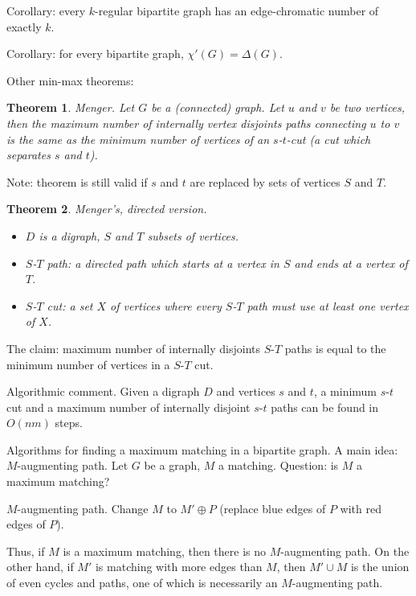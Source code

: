 \documentclass[12pt,a4paper]{article} \usepackage{fontspec}
\newtheorem{theorem}{Theorem} \newtheorem{definition}{Definition}
\begin{document}
Corollary: every \(k\)-regular bipartite graph has an edge-chromatic number of
exactly \(k\).

Corollary: for every bipartite graph, \(\chi'(G) = \Delta(G)\).

Other min-max theorems:

\begin{theorem} Menger.  Let \(G\) be a (connected) graph.  Let \(u\) and \(v\)
be two vertices, then the maximum number of internally vertex disjoints paths
connecting \(u\) to \(v\) is the same as the minimum number of vertices of an
\(s\)-\(t\)-cut (a cut which separates \(s\) and \(t\)).  \end{theorem}

Note: theorem is still valid if \(s\) and \(t\) are replaced by sets of vertices
\(S\) and \(T\).

\begin{theorem} Menger's, directed version.  \begin{itemize} \item \(D\) is a
digraph, \(S\) and \(T\) subsets of vertices.  \item \(S\)-\(T\) path: a
directed path which starts at a vertex in \(S\) and ends at a vertex of \(T\).
\item \(S\)-\(T\) cut: a set \(X\) of vertices where every \(S\)-\(T\) path must
use at least one vertex of \(X\).  \end{itemize} \end{theorem}

The claim: maximum number of internally disjoints \(S\)-\(T\) paths is equal to
the minimum number of vertices in a \(S\)-\(T\) cut.

Algorithmic comment.  Given a digraph \(D\) and vertices \(s\) and \(t\), a
minimum \(s\)-\(t\) cut and a maximum number of internally disjoint \(s\)-\(t\)
paths can be found in \(O(n m)\) steps.

Algorithms for finding a maximum matching in a bipartite graph.  A main idea:
\(M\)-augmenting path.  Let \(G\) be a graph, \(M\) a matching.  Question: is
\(M\) a maximum matching?

\(M\)-augmenting path.  Change \(M\) to \(M' \oplus P\) (replace blue edges of
\(P\) with red edges of \(P\)).

Thus, if \(M\) is a maximum matching, then there is no \(M\)-augmenting path.
On the other hand, if \(M'\) is matching with more edges than \(M\), then \(M'
\cup M\) is the union of even cycles and paths, one of which is necessarily an
\(M\)-augmenting path.
\end{document}
